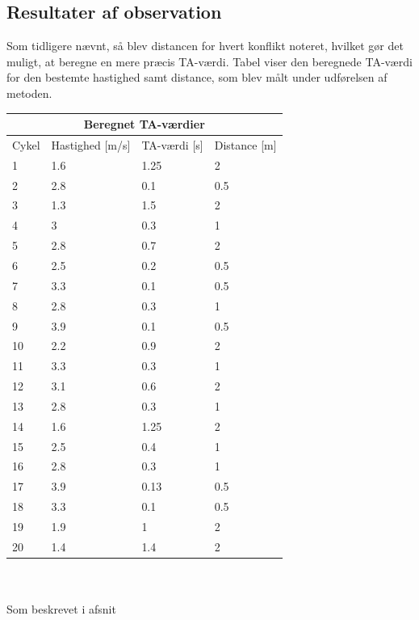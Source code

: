 \subsection{Resultater af observation}
\label{sub:def_konflikt}
Som tidligere nævnt, så blev distancen for hvert konflikt noteret, hvilket gør det muligt, at beregne en mere præcis TA-værdi. Tabel %
viser den beregnede TA-værdi for den bestemte hastighed samt distance, som blev målt under udførelsen af metoden.
\\
\begin{tabular}{ |p{1cm}|p{4cm}|p{4cm}|p{4cm}|  }
\hline
\multicolumn{4}{|c|}{Beregnet TA-værdier} \\
\hline
Cykel & Hastighed [m/s] & TA-værdi [s] & Distance [m] \\
\hline
1 & 1.6   & 1.25 & 2 \\
2 & 2.8 & 0.1 & 0.5 \\
3 & 1.3 & 1.5 & 2 \\
4 & 3  & 0.3 & 1 \\
5 & 2.8  & 0.7 & 2 \\
6 & 2.5   & 0.2 & 0.5 \\
7 & 3.3  & 0.1 & 0.5 \\
8 & 2.8  & 0.3 & 1 \\
9 & 3.9  & 0.1 & 0.5\\
10 & 2.2  & 0.9   & 2 \\
11 & 3.3 & 0.3 &  1 \\
12 & 3.1 & 0.6 &   2\\
13 & 2.8 & 0.3 & 1\\
14 & 1.6  & 1.25   & 2\\
15 & 2.5  & 0.4 & 1\\
16 & 2.8 & 0.3 & 1\\
17 & 3.9 & 0.13 &0.5\\
18 & 3.3 & 0.1 & 0.5\\
19 & 1.9  & 1 & 2\\
20 & 1.4  & 1.4 & 2\\
\hline
\end{tabular}
\\\\
Som beskrevet i afsnit %
